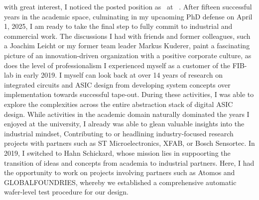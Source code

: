 with great interest, I noticed the posted position as \stelleText~at \firmaSatz~. 
After fifteen successful years in the academic space, culminating in my upcaoming PhD defense on April 1, 2025, I am ready to take the final step to fully commit to industrial and commercial work. The discussions I had with friends and former colleagues, such a Joachim Leicht or my former team leader Markus Kuderer, paint a fascinating picture of an innovation-driven organization with a positive corporate culture, as does the level of professionalism I experienced myself as a customer of the FIB-lab in early 2019. I myself can look back at over 14 years of research on integrated circuits and ASIC design from developing system concepts over implementation towards successful tape-out. During these activities, I was able to explore the complexities across the entire abstraction stack of digital ASIC design.%
While activities in the academic domain naturally dominated the years I enjoyed at the university, I already was able to glean valuable insights into the industrial mindset, Contributing to or headlining industry-focused research projects with partners such as ST Microelectronics, XFAB, or Bosch Sensortec. In 2019, I switched to Hahn Schickard, whose mission lies in suppoorting the transition of ideas and concepts from academia to industrial partners. Here, I had the opportunity to work on projects involving partners such as Atomos and GLOBALFOUNDRIES, whereby we established a comprehensive automatic wafer-level test procedure for our design.\par
